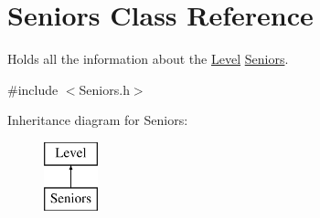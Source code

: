 \hypertarget{class_seniors}{}\section{Seniors Class Reference}
\label{class_seniors}


Holds all the information about the \hyperlink{class_level}{Level} \hyperlink{class_seniors}{Seniors}.  




{\ttfamily \#include $<$Seniors.\+h$>$}

Inheritance diagram for Seniors\+:\begin{figure}[H]
\begin{center}
\leavevmode
\includegraphics[height=2.000000cm]{class_seniors}
\end{center}
\end{figure}

